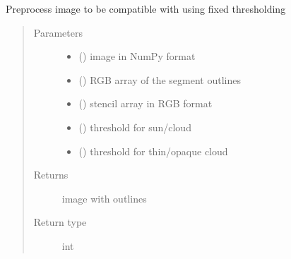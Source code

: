\documentclass[letterpaper,10pt,english]{sphinxmanual}
\begin{document}
\begin{fulllineitems}
\label{\detokenize{overlay:overlay.fixed}}
Preprocess image to be compatible with {\hyperref[\detokenize{overlay:overlay.outlines_over_image}]{}} using fixed thresholding
\begin{quote}\begin{description}
\item[{Parameters}] \leavevmode\begin{itemize}
\item {} 
 () \textendash{} image in NumPy format

\item {} 
 () \textendash{} RGB array of the segment outlines

\item {} 
 () \textendash{} stencil array in RGB format

\item {} 
 () \textendash{} threshold for sun/cloud

\item {} 
 () \textendash{} threshold for thin/opaque cloud

\end{itemize}

\item[{Returns}] \leavevmode
image with outlines

\item[{Return type}] \leavevmode
int

\end{description}\end{quote}

\end{fulllineitems}

\end{document}
